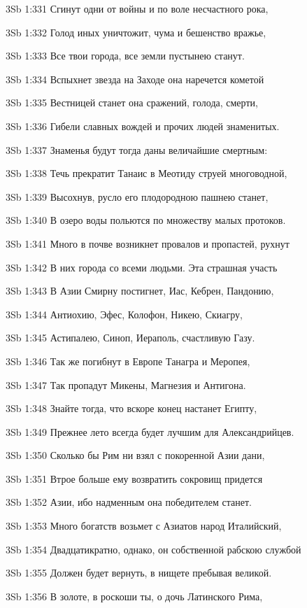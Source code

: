 \vs 3Sb 1:331 Сгинут одни от войны и по воле несчастного рока, 

\vs 3Sb 1:332 Голод иных уничтожит, чума и бешенство вражье, 

\vs 3Sb 1:333 Все твои города, все земли пустынею станут. 

\vs 3Sb 1:334 Вспыхнет звезда на Заходе  она наречется кометой  

\vs 3Sb 1:335 Вестницей станет она сражений, голода, смерти, 

\vs 3Sb 1:336 Гибели славных вождей и прочих людей знаменитых.

\vs 3Sb 1:337 Знаменья будут тогда даны величайшие смертным: 

\vs 3Sb 1:338 Течь прекратит Танаис в Меотиду струей многоводной,

\vs 3Sb 1:339 Высохнув, русло его плодородною пашнею станет,

\vs 3Sb 1:340 В озеро воды польются по множеству малых протоков. 

\vs 3Sb 1:341 Много в почве возникнет провалов и пропастей, рухнут 

\vs 3Sb 1:342 В них города со всеми людьми. Эта страшная участь 

\vs 3Sb 1:343 В Азии Смирну постигнет, Иас, Кебрен, Пандонию, 

\vs 3Sb 1:344 Антиохию, Эфес, Колофон, Никею, Скиагру,

\vs 3Sb 1:345 Астипалею, Синоп, Иераполь, счастливую Газу. 

\vs 3Sb 1:346 Так же погибнут в Европе Танагра и Меропея, 

\vs 3Sb 1:347 Так пропадут Микены, Магнезия и Антигона. 

\vs 3Sb 1:348 Знайте тогда, что вскоре конец настанет Египту, 

\vs 3Sb 1:349 Прежнее лето всегда будет лучшим для Александрийцев.

\vs 3Sb 1:350 Сколько бы Рим ни взял с покоренной Азии дани, 

\vs 3Sb 1:351 Втрое больше ему возвратить сокровищ придется 

\vs 3Sb 1:352 Азии, ибо надменным она победителем станет. 

\vs 3Sb 1:353 Много богатств возьмет с Азиатов народ Италийский,

\vs 3Sb 1:354 Двадцатикратно, однако, он собственной рабскою службой

\vs 3Sb 1:355 Должен будет вернуть, в нищете пребывая великой. 

\vs 3Sb 1:356 В золоте, в роскоши ты, о дочь Латинского Рима, 

